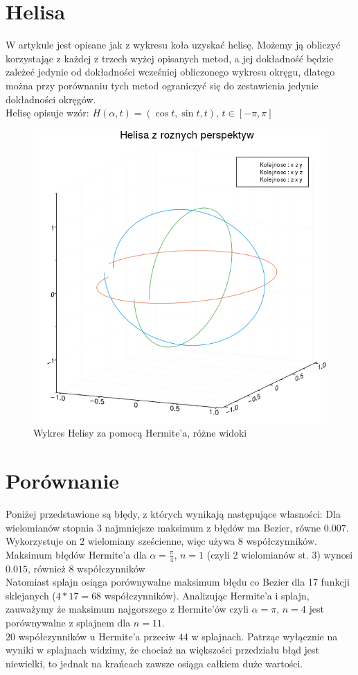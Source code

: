 \documentclass[paper=a4, fontsize=11pt]{scrartcl} %
\numberwithin{equation}{section} %
\numberwithin{figure}{section} %
\numberwithin{table}{section} %
\begin{document}
\section{Helisa}
W artykule \cite{hermite} jest opisane jak z wykresu koła uzyskać helisę. Możemy ją obliczyć korzystając z każdej z trzech wyżej opisanych metod, a jej dokładność będzie zależeć jedynie od dokładności wcześniej obliczonego wykresu okręgu, dlatego można przy porównaniu tych metod ograniczyć się do zestawienia jedynie dokładności okręgów. \\
Helisę opisuje wzór: $H(\alpha, t) = (\cos t, \sin t, t)$, $t \in [-\pi, \pi]$
\begin{figure}[h!]
 \includegraphics[width=0.8\linewidth]{hermitehelisa.png}
  \caption{Wykres Helisy za pomocą Hermite'a, różne widoki}
  \label{helisa}
\end{figure}
\FloatBarrier

\section{Porównanie}
Poniżej przedstawione są błędy, z których wynikają następujące własności: 
\medbreak
Dla wielomianów stopnia 3 najmniejsze maksimum z błędów ma Bezier, równe $0.007$. Wykorzystuje on $2$ wielomiany sześcienne, więc używa $8$ współczynników. \\
Maksimum błędów Hermite'a dla $\alpha = \frac{\pi}{4}$, $n = 1$ (czyli 2  wielomianów st. $3$) wynosi $0.015$, również 8 współczynników \\
Natomiast splajn osiąga porównywalne maksimum błędu co Bezier dla 17 funkcji sklejanych ($4 * 17 = 68$ współczynników). 
\medbreak
Analizując Hermite'a i splajn, zauważymy że maksimum najgorszego z Hermite'ów czyli  $\alpha = \pi$, $n = 4$ jest porównywalne z splajnem dla $n = 11$.\\ $20$ współczynników u Hermite'a przeciw $44$ w splajnach.
\medbreak
Patrząc wyłącznie na wyniki w splajnach widzimy, że chociaż na większości przedziału błąd jest niewielki, to jednak na krańcach zawsze osiąga całkiem duże wartości.
\end{document}
